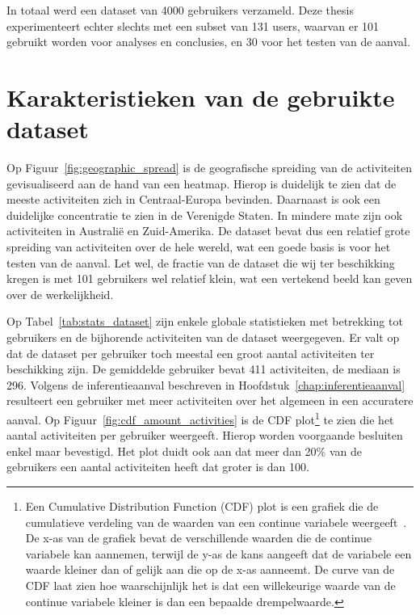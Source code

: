In totaal werd een dataset van 4000 gebruikers verzameld. Deze thesis
experimenteert echter slechts met een subset van 131 users, waarvan er 101
gebruikt worden voor analyses en conclusies, en 30 voor het testen van de
aanval.

\section{Karakteristieken van de gebruikte dataset}
Op Figuur~\ref{fig:geographic_spread} is de geografische spreiding van de
activiteiten gevisualiseerd aan de hand van een heatmap. Hierop is duidelijk te
zien dat de meeste activiteiten zich in Centraal-Europa bevinden. Daarnaast is
ook een duidelijke concentratie te zien in de Verenigde Staten. In mindere mate
zijn ook activiteiten in Australië en Zuid-Amerika. De dataset bevat dus een
relatief grote spreiding van activiteiten over de hele wereld, wat een goede
basis is voor het testen van de aanval. Let wel, de fractie van de dataset die
wij ter beschikking kregen is met 101 gebruikers wel relatief klein, wat een
vertekend beeld kan geven over de werkelijkheid.

Op Tabel~\ref{tab:stats_dataset} zijn enkele globale statistieken met
betrekking tot gebruikers en de bijhorende activiteiten van de dataset
weergegeven. Er valt op dat de dataset per gebruiker toch meestal een groot
aantal activiteiten ter beschikking zijn. De gemiddelde gebruiker bevat 411
activiteiten, de mediaan is 296. Volgens de inferentieaanval beschreven in
Hoofdstuk~\ref{chap:inferentieaanval} resulteert een gebruiker met meer
activiteiten over het algemeen in een accuratere aanval. Op
Figuur~\ref{fig:cdf_amount_activities} is de \ac{CDF} plot\footnote{Een
    Cumulative Distribution Function (CDF) plot is een grafiek die de cumulatieve
    verdeling van de waarden van een continue variabele
    weergeeft~\cite{CursusSt38:online}. De x-as van de grafiek bevat de
    verschillende waarden die de continue variabele kan aannemen, terwijl de y-as
    de kans aangeeft dat de variabele een waarde kleiner dan of gelijk aan die op
    de x-as aanneemt. De curve van de CDF laat zien hoe waarschijnlijk het is dat
    een willekeurige waarde van de continue variabele kleiner is dan een bepaalde
    drempelwaarde.} te zien die het aantal activiteiten per gebruiker weergeeft.
Hierop worden voorgaande besluiten enkel maar bevestigd. Het plot duidt ook aan
dat meer dan 20\% van de gebruikers een aantal activiteiten heeft dat groter is
dan 100.

